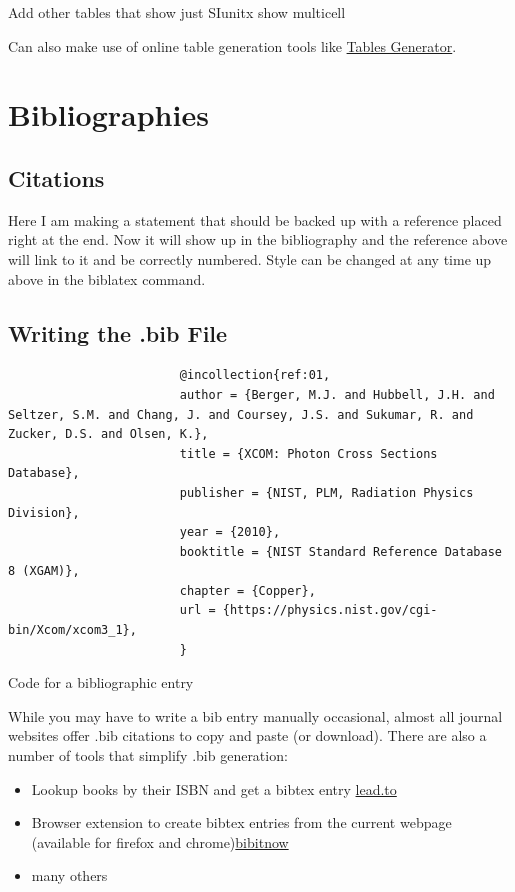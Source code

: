 \documentclass[hidelinks, 12pt]{article}%
\begin{document}
        Add other tables that show just SIunitx
        show multicell

        Can also make use of online table generation tools like \href{https://www.tablesgenerator.com/}{Tables Generator}.

    \section{Bibliographies}
        \subsection{Citations}
            Here I am making a statement that should be backed up with a reference placed right at the end. \cite{ref:01}
            Now it will show up in the bibliography and the reference above will link to it and be correctly numbered.
            Style can be changed at any time up above in the biblatex command.
        \subsection{Writing the .bib File}
            \begin{listing}[H]
                \begin{centering}
                    \begin{verbatim}
                        @incollection{ref:01,
                        author = {Berger, M.J. and Hubbell, J.H. and Seltzer, S.M. and Chang, J. and Coursey, J.S. and Sukumar, R. and Zucker, D.S. and Olsen, K.},
                        title = {XCOM: Photon Cross Sections Database},
                        publisher = {NIST, PLM, Radiation Physics Division},
                        year = {2010},
                        booktitle = {NIST Standard Reference Database 8 (XGAM)},
                        chapter = {Copper},
                        url = {https://physics.nist.gov/cgi-bin/Xcom/xcom3_1},
                        }
                    \end{verbatim}
                    \caption{Code for a bibliographic entry}
                    \label{lst:bibliography}
                \end{centering}
            \end{listing}
            While you may have to write a bib entry manually occasional, almost all journal websites offer .bib citations to copy and paste (or download).
            There are also a number of tools that simplify .bib generation:
            \begin{itemize}
                \item Lookup books by their ISBN and get a bibtex entry \href{https://lead.to/amazon/com/?key=+&si=all&op=bt&bn=&so=sa&ht=us}{lead.to}
                \item Browser extension to create bibtex entries from the current webpage (available for firefox and chrome)\href{https://github.com/Langenscheiss/bibitnow}{bibitnow}
                \item many others
            \end{itemize}
\end{document}
